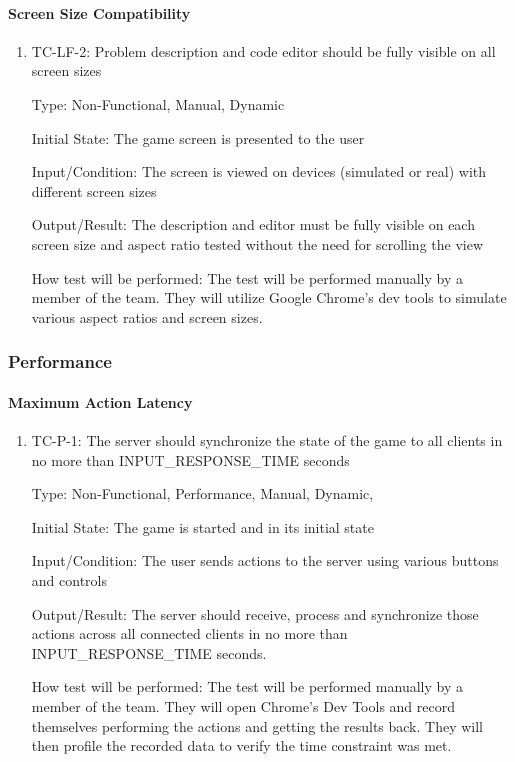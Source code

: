 \documentclass[12pt, titlepage]{article}
\begin{document}
\paragraph{Screen Size Compatibility}

\begin{enumerate}
\item{TC-LF-2: Problem description and code editor should be fully visible on all screen sizes}

Type: Non-Functional, Manual, Dynamic
					
Initial State: The game screen is presented to the user
					
Input/Condition: The screen is viewed on devices (simulated or real) with different screen sizes
					
Output/Result: The description and editor must be fully visible on each screen size and aspect ratio tested without the need for scrolling the view
					
How test will be performed: The test will be performed manually by a member of the team. They will utilize Google Chrome's dev tools to simulate various aspect ratios and screen sizes.
\end{enumerate}


\subsubsection{Performance}

\paragraph{Maximum Action Latency}

\begin{enumerate}
\item{TC-P-1: The server should synchronize the state of the game to all clients in no more than INPUT\_RESPONSE\_TIME seconds}

Type: Non-Functional, Performance, Manual, Dynamic,
					
Initial State: The game is started and in its initial state
					
Input/Condition: The user sends actions to the server using various buttons and controls
					
Output/Result: The server should receive, process and synchronize those actions across all connected clients in no more than INPUT\_RESPONSE\_TIME seconds.
					
How test will be performed: The test will be performed manually by a member of the team. They will open Chrome's Dev Tools and record themselves performing the actions and getting the results back. They will then profile the recorded data to verify the time constraint was met.
\end{enumerate}
\end{document}
